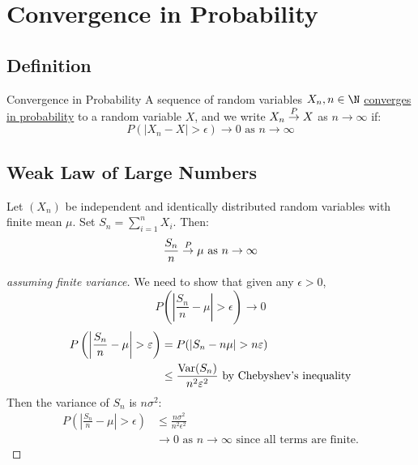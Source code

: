 \documentclass[../Main.tex]{subfiles}
\begin{document}
\section{Convergence in Probability}
\subsection{Definition}
\begin{definition}{Convergence in Probability}
    A sequence of random variables $X_n, n \in \N$ \underline{converges in probability} to a random variable $X$, and we write $X_n \overset{P}{\rightarrow} X$ as $n \to \infty$ if:
    \begin{equation*}
        P(|X_n - X| > \epsilon) \to 0 \text{ as } n \to \infty
    \end{equation*}
\end{definition}
\subsection{Weak Law of Large Numbers}
\begin{theorem}
    Let $(X_n)$ be independent and identically distributed random variables with finite mean $\mu$. Set $S_n = \sum_{i = 1}^n X_i$. Then:
    \begin{equation*}
        \frac{S_n}{n} \overset{P}{\rightarrow} \mu \text{ as } n \to \infty
    \end{equation*}
    \label{thmWeakLawLargeNums}
\end{theorem}
\begin{proof}[assuming finite variance]
    We need to show that given any $\epsilon > 0$,
    \begin{equation*}
        P\left(\left|\frac{S_n}{n} - \mu\right| > \epsilon\right) \to 0
    \end{equation*}
    \begin{align*}
        P\left(\left|\frac{S_n}{n} - \mu\right| > \varepsilon\right) &= P(|S_n - n \mu| > n\varepsilon) \\
        &\leq \frac{\operatorname{Var}(S_n)}{n^2 \varepsilon^2} \text{ by Chebyshev's inequality}
    \end{align*}
    Then the variance of $S_n$ is $n \sigma^2$:
    \begin{align*}
        P\left(\left|\frac{S_n}{n} - \mu\right| > \epsilon\right) &\leq \frac{n\sigma^2}{n^2\epsilon^2} \\
        &\to 0 \text{ as } n \to \infty \text{ since all terms are finite.}
    \end{align*}
\end{proof}
\end{document}
